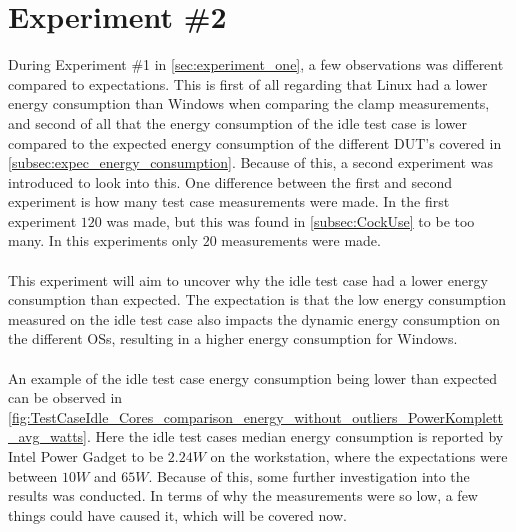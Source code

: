 \section{Experiment \#2}\label{sec:experiment_two}

During Experiment \#1 in \cref{sec:experiment_one}, a few observations was different compared to expectations. This is first of all regarding that Linux had a lower energy consumption than Windows when comparing the clamp measurements, and second of all that the energy consumption of the idle test case is lower compared to the expected energy consumption of the different DUT's covered in \cref{subsec:expec_energy_consumption}. Because of this, a second experiment was introduced to look into this. One difference between the first and second experiment is how many test case measurements were made. In the first experiment $120$ was made, but this was found in \cref{subsec:CockUse} to be too many. In this experiments only $20$ measurements were made. 

\paragraph*{}
This experiment will aim to uncover why the idle test case had a lower energy consumption than expected. The expectation is that the low energy consumption measured on the idle test case also impacts the dynamic energy consumption on the different OSs, resulting in a higher energy consumption for Windows.

\paragraph*{}
An example of the idle test case energy consumption being lower than expected can be observed in \cref{fig:TestCaseIdle_Cores_comparison_energy_without_outliers_PowerKomplett_avg_watts}. Here the idle test cases median energy consumption is reported by Intel Power Gadget to be $2.24W$ on the workstation, where the expectations were between $10W$ and $65W$. Because of this, some further investigation into the results was conducted. In terms of why the measurements were so low, a few things could have caused it, which will be covered now.



